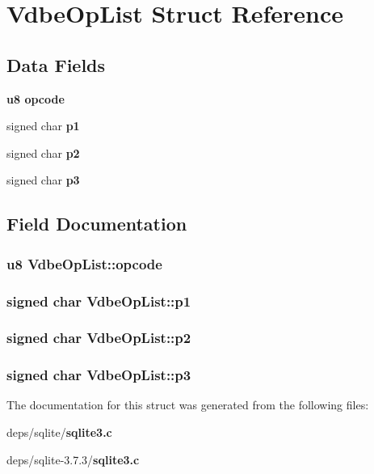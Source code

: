 \section{Vdbe\-Op\-List Struct Reference}
\label{structVdbeOpList}
\subsection*{Data Fields}
\begin{CompactItemize}
\item 
\bf{u8} \bf{opcode}
\item 
signed char \bf{p1}
\item 
signed char \bf{p2}
\item 
signed char \bf{p3}
\end{CompactItemize}


\subsection{Field Documentation}
\subsubsection{\setlength{\rightskip}{0pt plus 5cm}\bf{u8} \bf{Vdbe\-Op\-List::opcode}}\label{structVdbeOpList_0c2e0d0875e71d5c74da66f58c56fa6c}


\subsubsection{\setlength{\rightskip}{0pt plus 5cm}signed char \bf{Vdbe\-Op\-List::p1}}\label{structVdbeOpList_2cc3e01d6eae502d78fc3f963ca1c7e6}


\subsubsection{\setlength{\rightskip}{0pt plus 5cm}signed char \bf{Vdbe\-Op\-List::p2}}\label{structVdbeOpList_756533a25d1b10f40cb717d1c880ef49}


\subsubsection{\setlength{\rightskip}{0pt plus 5cm}signed char \bf{Vdbe\-Op\-List::p3}}\label{structVdbeOpList_701434ccf364bcbb45c8bce6483e0d65}




The documentation for this struct was generated from the following files:\begin{CompactItemize}
\item 
deps/sqlite/\bf{sqlite3.c}\item 
deps/sqlite-3.7.3/\bf{sqlite3.c}\end{CompactItemize}
